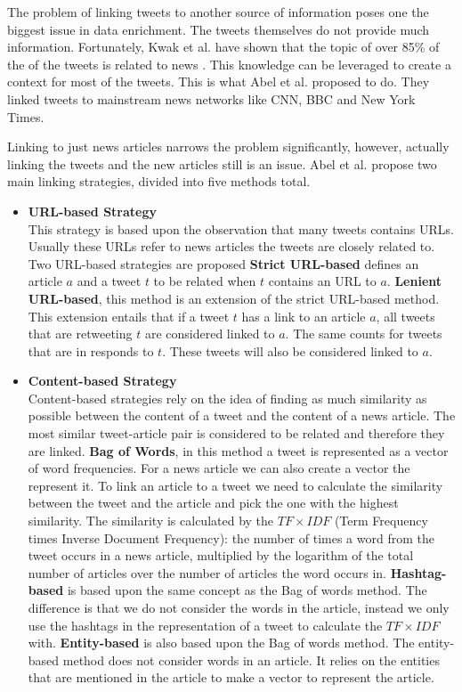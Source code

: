 \documentclass{article}
\begin{document}
The problem of linking tweets to another source of information poses one the biggest issue in data enrichment. The tweets themselves do not provide much information. Fortunately, Kwak et al. have shown that the topic of over 85\% of the of the tweets is related to news \cite{newsmedia}. This knowledge can be leveraged to create a context for most of the tweets.  This is what Abel et al. proposed to do\cite{enrichmentForProfiling}. They linked tweets to mainstream news networks like CNN, BBC and New York Times.

Linking to just news articles narrows the problem significantly, however, actually linking the tweets and the new articles still is an issue. Abel et al. propose two main linking strategies, divided into five methods total.
\begin{itemize}
\item \textbf{URL-based Strategy}\\
This strategy is based upon the observation that many tweets contains URLs. Usually these URLs refer to news articles the tweets are closely related to. Two URL-based strategies are proposed
	\subitem \textbf{Strict URL-based} defines an article $a$ and a tweet $t$ to be related when $t$ contains an URL to $a$.
	\subitem \textbf{Lenient URL-based}, this method is an extension of the strict URL-based method. This extension entails that if a tweet $t$ has a link to an article $a$, all tweets that are retweeting $t$ are considered linked to $a$. The same counts for tweets that are in responds to $t$. These tweets will also be considered linked to $a$.
\item \textbf{Content-based Strategy}\\
Content-based strategies rely on the idea of finding as much similarity as possible between the content of a tweet and the content of a news article. The most similar tweet-article pair is considered to be related and therefore they are linked.
	\subitem \textbf{Bag of Words}, in this method a tweet is represented as a vector of word frequencies. For a news article we can also create a vector the represent it. To link an article to a tweet we need to calculate the similarity between the tweet and the article and pick the one with the highest similarity. The similarity is calculated by the $TF \times IDF$ (Term Frequency times Inverse Document Frequency): the number of times a word from the tweet occurs in a news article, multiplied by the logarithm of the total number of articles over the number of articles the word occurs in. \cite{tfidf}
	\subitem \textbf{Hashtag-based} is based upon the same concept as the Bag of words method. The difference is that we do not consider the words in the article, instead we only use the hashtags in the representation of a tweet to calculate the $TF \times IDF$ with.
	\subitem \textbf{Entity-based} is also based upon the Bag of words method. The entity-based method does not consider words in an article. It relies on the entities that are mentioned in the article to make a vector to represent the article. 
\end{itemize}
\end{document}
